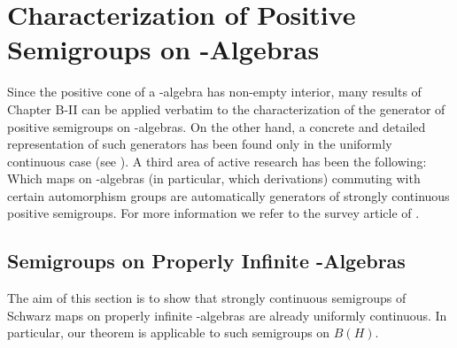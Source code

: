 \setcounter{chapter}{1}

\chapter{Characterization of Positive Semigroups on \WA-Algebras}\label{chap:d2}
Since the positive cone of a \CA-algebra has non-empty interior, many results of Chapter B-II can be applied verbatim to the characterization of the generator of positive semigroups on \CA-algebras.
On the other hand, a concrete and detailed representation of such generators has been found only in the uniformly continuous case (see \citet{lindblad:1976}).
A third area of active research has been the following: Which maps on \CA-algebras (in particular, which derivations) commuting with certain automorphism groups are automatically generators of strongly continuous positive semigroups.
For more information we refer to the survey article of \citet{evans:1984}.
\section{Semigroups on Properly Infinite \WA-Algebras}
The aim of this section is to show that strongly continuous semigroups of Schwarz maps on properly infinite \WA-algebras are already uniformly continuous.
In particular, our theorem is applicable to such semigroups on $B(H)$.

